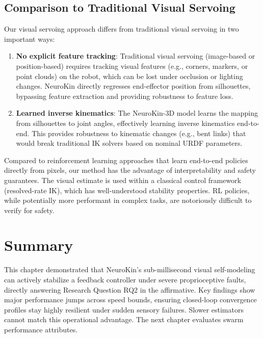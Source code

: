 \documentclass[12pt,a4paper,oneside]{report}
\begin{document}
\subsection{Comparison to Traditional Visual Servoing}

Our visual servoing approach differs from traditional visual servoing in two important ways:
\begin{enumerate}
    \item \textbf{No explicit feature tracking}: Traditional visual servoing (image-based or position-based) requires tracking visual features (e.g., corners, markers, or point clouds) on the robot, which can be lost under occlusion or lighting changes. NeuroKin directly regresses end-effector position from silhouettes, bypassing feature extraction and providing robustness to feature loss.
    \item \textbf{Learned inverse kinematics}: The NeuroKin-3D model learns the mapping from silhouettes to joint angles, effectively learning inverse kinematics end-to-end. This provides robustness to kinematic changes (e.g., bent links) that would break traditional IK solvers based on nominal URDF parameters.
\end{enumerate}

Compared to reinforcement learning approaches that learn end-to-end policies directly from pixels, our method has the advantage of interpretability and safety guarantees. The visual estimate is used within a classical control framework (resolved-rate IK), which has well-understood stability properties. RL policies, while potentially more performant in complex tasks, are notoriously difficult to verify for safety.

\section{Summary}

This chapter demonstrated that NeuroKin's sub-millisecond visual self-modeling can actively stabilize a feedback controller under severe proprioceptive faults, directly answering Research Question RQ2 in the affirmative. Key findings show major performance jumps across speed bounds, ensuring closed-loop convergence profiles stay highly resilient under sudden sensory failures. Slower estimators cannot match this operational advantage. The next chapter evaluates swarm performance attributes.

\clearpage

\end{document}

